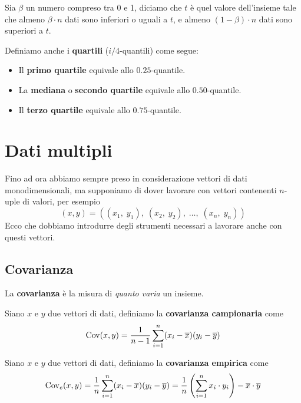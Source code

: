 \begin{definition}
	Sia $\beta$ un numero compreso tra 0 e 1, diciamo che $t$ è quel valore dell'insieme tale che
	almeno $\beta \cdot n$ dati sono inferiori o uguali a $t$, e almeno $(1-\beta) \cdot n$ dati
	sono superiori a $t$.
\end{definition}

\begin{definition}
	Definiamo anche i \textbf{quartili} ($i/4$-quantili) come segue:
	\begin{itemize}
		\item Il \textbf{primo quartile} equivale allo $0.25$-quantile.
		\item La \textbf{mediana} o \textbf{secondo quartile} equivale allo $0.50$-quantile.
		\item Il \textbf{terzo quartile} equivale allo $0.75$-quantile.
	\end{itemize}
\end{definition}

\section{Dati multipli}
Fino ad ora abbiamo sempre preso in considerazione vettori di dati monodimensionali, ma supponiamo
di dover lavorare con vettori contenenti $n$-uple di valori, per esempio
\[ (x, y) = ((x_1, \; y_1), \; (x_2, \; y_2), \; \dots, \; (x_n, \; y_n)) \]
Ecco che dobbiamo introdurre degli strumenti necessari a lavorare anche con questi vettori.

\subsection{Covarianza}
La \textbf{covarianza} è la misura di \emph{quanto varia} un insieme.

\begin{definition}
	Siano $x$  e $y$ due vettori di dati, definiamo la \textbf{covarianza campionaria} come
	\[ \operatorname{Cov}(x, y) = \frac{1}{n - 1} \sum_{i=1}^n (x_i - \overline{x}) (y_i - \overline{y}) \]
\end{definition}

\begin{definition}
	Siano $x$  e $y$ due vettori di dati, definiamo la \textbf{covarianza empirica} come
	\[
		\operatorname{Cov}_e(x, y) = \frac{1}{n} \sum_{i=1}^n (x_i - \overline{x}) (y_i - \overline{y}) =
		\frac{1}{n} \left( \sum_{i=1}^n x_i \cdot y_i \right) - \overline{x} \cdot \overline{y}
	\]
\end{definition}


